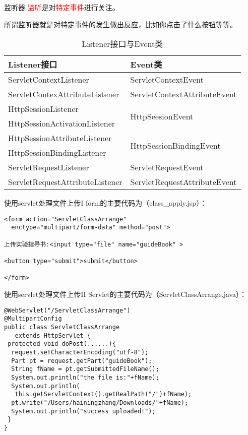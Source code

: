 \documentclass{beamer}
\begin{document}
\begin{frame}{监听器}
\textcolor{red}{监听}是对\textcolor{red}{特定事件}进行关注。

所谓监听器就是对特定事件的发生做出反应，比如你点击了什么按钮等等。
\begin{table}
\begin{tabular}{ll}
\toprule
\textbf{Listener接口}&\textbf{Event类}\\
\midrule
ServletContextListener&ServletContextEvent\\
ServletContexAttributeListener&ServletContextAttributeEvent\\
HttpSessionListener&\multirow{2}{*}{HttpSeesionEvent}\\
HttpSessionActivationListener&\\
HttpSessionAttributeListener&\multirow{2}{*}{HttpSessionBindingEvent}\\
HttpSessionBindingListener&\\
ServletRequestListener&ServletRequestEvent\\
ServletRequestAttributeListener&ServletRequestAttributeEvent\\
\bottomrule
\end{tabular}
\caption{Listener接口与Event类}
\end{table}
\end{frame}


\begin{frame}[fragile]{使用servlet处理文件上传I}
form的主要代码为（class\_apply.jsp）：
\begin{lstlisting}
<form action="ServletClassArrange" 
  enctype="multipart/form-data" method="post">

上传实验指导书:<input type="file" name="guideBook" >

<button type="submit">submit</button>

</form>
\end{lstlisting}
\end{frame}
\begin{frame}[fragile]{使用servlet处理文件上传II}
Servlet的主要代码为（ServletClassArrange.java）：
\begin{lstlisting}
@WebServlet("/ServletClassArrange")
@MultipartConfig
public class ServletClassArrange 
   extends HttpServlet {
 protected void doPost(......){
  request.setCharacterEncoding("utf-8");
  Part pt = request.getPart("guideBook");
  String fName = pt.getSubmittedFileName();
  System.out.println("the file is:"+fName);
  System.out.println(
   this.getServletContext().getRealPath("/")+fName);
  pt.write("/Users/hainingzhang/Downloads/"+fName);
  System.out.println("success uploaded!");
 }
}
\end{lstlisting}
\end{frame}
\end{document}
